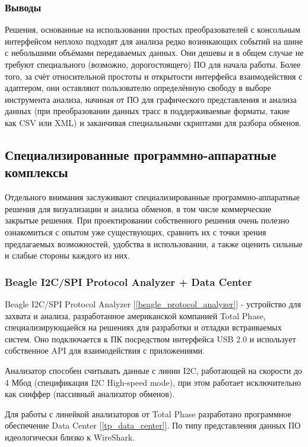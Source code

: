 \subsubsection*{Выводы}

Решения, основанные на использовании простых преобразователей с консольным интерфейсом неплохо подходят для анализа редко возникающих событий на шине с небольшими объёмами передаваемых данных. Они дешевы и в общем случае не требуют специального (возможно, дорогостоящего) ПО для начала работы. Более того, за счёт относительной простоты и открытости интерфейса взаимодействия с адаптером, они оставляют пользователю определённую свободу в выборе инструмента анализа, начиная от ПО для графического представления и анализа данных (при преобразовании данных трасс в поддерживаемые форматы, такие как CSV или XML) и заканчивая специальными скриптами для разбора обменов.

\subsection{Специализированные программно-аппаратные комплексы}

Отдельного внимания заслуживают специализированные программно-аппаратные решения для визуализации и анализа обменов, в том числе коммерческие закрытые решения. При проектировании собственного решения очень полезно ознакомиться с опытом уже существующих, сравнить их с точки зрения предлагаемых возможностей, удобства в использовании, а также оценить сильные и слабые стороны каждого из них.

\subsubsection*{Beagle I2C/SPI Protocol Analyzer + Data Center}

Beagle I2C/SPI Protocol Analyzer [\ref{beagle_protocol_analyzer}] - устройство для захвата и анализа, разработанное американской компанией Total Phase, специализирующаейся на решениях для разработки и отладки встраиваемых систем. Оно подключается к ПК посредством интерфейса USB 2.0 и использует собственное API для взаимодействия с приложениями.

Анализатор способен считывать данные с линии I2C, работающей на скорости до 4 Мбод (спецификация I2C High-speed mode), при этом работает исключительно как сниффер (пассивный анализатор обменов).

Для работы с линейкой анализаторов от Total Phase разработано программное обеспечение Data Center [\ref{tp_data_center}]. По типу представления данных ПО идеологически близко к WireShark.

